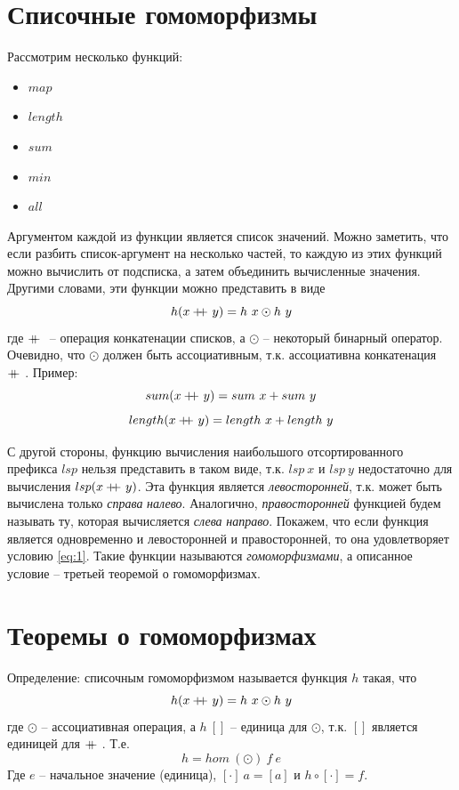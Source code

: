 \documentclass[a4paper,11pt]{article}
\newcommand\doubleplus{+\kern-1.3ex+\kern0.8ex}
\begin{document}
\section{Списочные гомоморфизмы}
Рассмотрим несколько функций:
\begin{itemize}
\item $map$
\item $length$
\item $sum$
\item $min$
\item $all$
\end{itemize}
Аргументом каждой из функции является список значений. Можно заметить, что
если разбить список-аргумент на несколько частей, то каждую из этих функций
можно вычислить от подсписка, а затем объединить вычисленные значения. Другими
словами, эти функции можно представить в виде
\begin{equation}
  h(x \doubleplus y) = h~x \odot h~y
  \label{eq:1}
\end{equation}
где $\doubleplus$ -- операция конкатенации списков, а $\odot$ -- некоторый
бинарный оператор. Очевидно, что $\odot$ должен быть ассоциативным, т.к.
ассоциативна конкатенация $\doubleplus$. Пример:
\begin{equation*}
  sum(x \doubleplus y) = sum~x + sum~y
\end{equation*}
\begin{equation*}
  length(x \doubleplus y) = length~x + length~y
\end{equation*}

С другой стороны, функцию вычисления наибольшого отсортированного префикса
$lsp$ нельзя представить в таком виде, т.к. $lsp~x$ и $lsp~y$ недостаточно
для вычисления $lsp(x \doubleplus y)$. Эта функция является 
\emph{левосторонней}, т.к. может быть вычислена только \emph{справа} 
\emph{налево}. Аналогично, \emph{правосторонней} функцией будем называть ту,
которая вычисляется \emph{слева} \emph{направо}. Покажем, что если функция
является одновременно и левосторонней и правосторонней, то она удовлетворяет
условию \ref{eq:1}. Такие функции называются \emph{гомоморфизмами}, а 
описанное условие -- третьей теоремой о гомоморфизмах.

\section{Теоремы о гомоморфизмах}
Определение: списочным гомоморфизмом называется функция $h$ такая, что
\begin{equation*}
  h(x \doubleplus y) = h~x \odot h~y
\end{equation*}
где $\odot$ -- ассоциативная операция, а $h~[]$ -- единица для 
$\odot$, т.к. $[]$ является единицей для $\doubleplus$. Т.е.
\begin{equation*}
  h = hom~(\odot)~f~e
\end{equation*}
Где $e$ -- начальное значение (единица), $[\cdot]~a = [a]$ и
$h \circ [\cdot] = f$.
\end{document}
